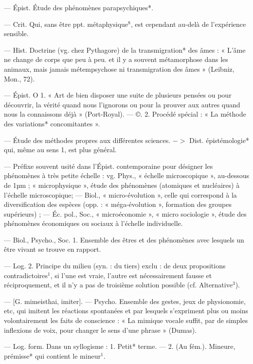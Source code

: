 \begin{itemize}[leftmargin=1cm, label=, itemsep=1pt]
 — Épist. Étude des
phénomènes parapsychiques*.

 — Crit. Qui, sans être
ppt. métaphysique$^8$, est cependant
au-delà de l'expérience sensible.

 — Hist. Doctrine (vg.
chez Pythagore) de la transmigration* des âmes : « L’âme ne change
de corps que peu à peu. et il y a
souvent métamorphose dans les
animaux, mais jamais métempsychose ni transmigration des âmes »
(Leibniz, Mon., 72).

 — Épist. O 1. « Art de bien
disposer une suite de plusieurs
pensées ou pour découvrir, la vérité
quand nous l’ignorons ou pour la
prouver aux autres quand nous la
connaissons déjà » (Port-Royal). —
©. 2. Procédé spécial : « La méthode
des variations* concomitantes ».

 — Étude des méthodes
propres aux différentes sciences.
$->$ Dist. épistémologie* qui, même
au sens 1, est plus général.

 — Préfixe souvent usité dans
l'Épist. contemporaine pour désigner les phénomènes à très petite
échelle : vg. Phys., « échelle microscopique », au-dessous de 1µm ;
« microphysique », étude des phénomènes (atomiques et nucléaires) à
l'échelle microscopique; — Biol.,
« micro-évolution », celle qui correspond à la diversification des espèces
(opp. : « méga-évolution », formation
des groupes supérieurs) ; — Éc. pol.,
Soc., « microéconomie », « micro
sociologie », étude des phénomènes
économiques ou sociaux à l'échelle
individuelle.

 — Biol., Psycho., Soc. 1. Ensemble des êtres et des phénomènes
avec lesquels un être vivant se trouve
en rapport.

— Log. 2. Principe du milieu
(syn. : du tiers) exclu : de deux propositions contradictoires$^1$, si l’une
est vraie, l’autre est nécessairement
fausse et réciproquement, et il n’y a
pas de troisième solution possible
(cf. Alternative$^3$).

 — [G. mimeisthai, imiter]. —
Psycho. Ensemble des gestes, jeux
de physionomie, etc, qui imitent
les réactions spontanées et par lesquels s'expriment plus ou moins
volontairement les faits de conscience : « La mimique vocale suffit,
par de simples inflexions de voix,
pour changer le sens d’une phrase »
(Dumas).

 — Log. form. Dans un syllogisme : 1. Petit* terme. — 2. (Au
fém.). Mineure, prémisse* qui contient le mineur$^1$.


\end{itemize}
